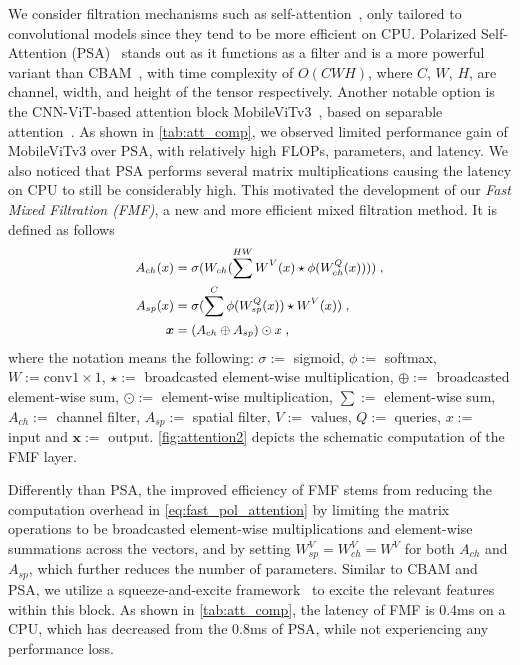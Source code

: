 We consider filtration mechanisms such as self-attention~\cite{vaswani2017attention}, only tailored to convolutional models since they tend to be more efficient on CPU. Polarized Self-Attention (PSA)~\cite{liu2021polarized} stands out as it functions as a filter and is a more powerful variant than CBAM~\cite{woo2018cbam}, with time complexity of $O(CWH)$, where $C$, $W$, $H$, are channel, width, and height of the tensor respectively. Another notable option is the CNN-ViT-based attention block MobileViTv3~\cite{wadekar2022mobilevitv3}, based on separable attention~\cite{mehta2022separable}. As shown in \ref{tab:att_comp}, we observed limited performance gain of MobileViTv3 over PSA, with relatively high FLOPs, parameters, and latency. We also noticed that PSA performs several matrix multiplications causing the latency on CPU to still be considerably high. This motivated the development of our \emph{Fast Mixed Filtration (FMF)}, a new and more efficient mixed filtration method. It is defined as follows
\begin{equation}\small
  \centering
  \label{eq:fast_pol_attention}
      \begin{aligned}   
          A_{ch}(x) &= \sigma(W_{ch}(\sum^{HW} W^V(x) \star \phi(W^Q_{ch}(x))  )) \; , \\ %
          A_{sp}(x) &= \sigma(\sum^{C} \phi(W^Q_{sp}(x)) \star W^V(x))\; ,\\ %
          \boldsymbol{x} &= (A_{ch} \oplus  A_{sp}) \odot x \; , \\
\end{aligned}
\end{equation}
where the notation means the following: $\sigma :=$ sigmoid, $\phi :=$ softmax, $W := \mathrm{conv}1 \times 1$,  $\star :=$ broadcasted element-wise multiplication, $\oplus :=$ broadcasted element-wise sum, $\odot :=$ element-wise multiplication, $\sum :=$ element-wise sum, $A_{ch} :=$ channel filter, $A_{sp} :=$ spatial filter, $V:=$ values, $Q:=$ queries, $x :=$ input  and $\boldsymbol{x} :=$ output. \ref{fig:attention2} depicts the schematic computation of the FMF layer.

Differently than PSA, the improved efficiency of FMF stems from reducing the computation overhead in \ref{eq:fast_pol_attention} by limiting the matrix operations to be broadcasted element-wise multiplications and element-wise summations across the vectors, and by setting $W^V_{sp}=W^V_{ch}=W^V$ for both $A_{ch}$ and $A_{sp}$, which further reduces the number of parameters. Similar to CBAM and PSA, we utilize a squeeze-and-excite framework~\cite{iandola2016squeezenet} to excite the relevant features within this block. As shown in \ref{tab:att_comp}, the latency of FMF is 0.4ms on a CPU, which has decreased from the 0.8ms of PSA, while not experiencing any performance loss.

